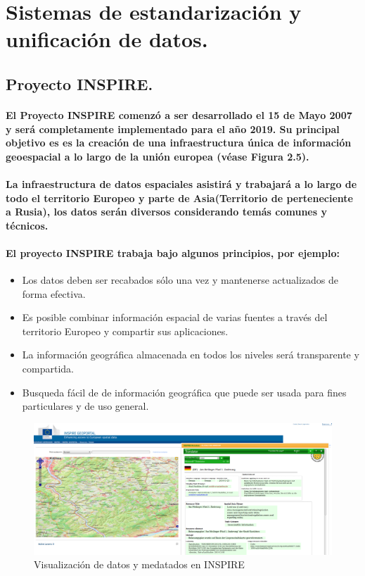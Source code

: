 \section{Sistemas de estandarización y unificación de datos.}
  \subsection{Proyecto INSPIRE.}
    \paragraph{El Proyecto INSPIRE comenzó a ser desarrollado el 15 de Mayo 2007 y será completamente implementado para el año 2019. Su principal objetivo es es la creación de una infraestructura única de información geoespacial a lo largo de la unión europea (véase Figura 2.5).} 
    \paragraph{La infraestructura de datos espaciales asistirá y trabajará a lo largo de todo el territorio Europeo y parte de Asia(Territorio de perteneciente a Rusia), los datos serán diversos considerando temás comunes y técnicos.}
    \paragraph{El proyecto INSPIRE trabaja bajo algunos principios, por ejemplo:}
    \begin{itemize}
      \item Los datos deben ser recabados sólo una vez y mantenerse actualizados de forma efectiva.
      \item Es posible combinar información espacial de varias fuentes a través del territorio Europeo y compartir sus aplicaciones.
      \item La información geográfica almacenada en todos los niveles será transparente y compartida.
      \item Busqueda fácil de de información geográfica que puede ser usada para fines particulares y de uso general.
    \end{itemize}
    \begin{figure}[h!]
        \centering
          \includegraphics[width=\textwidth]{./images/INSPIRE.png}
        \caption{Visualización de datos y medatados en INSPIRE}
    \end{figure}
